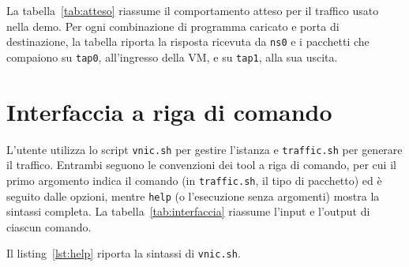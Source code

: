 La tabella~\ref{tab:atteso} riassume il comportamento atteso per il traffico usato nella demo. Per ogni combinazione di programma caricato e porta di destinazione, la tabella riporta la risposta ricevuta da \texttt{ns0} e i pacchetti che compaiono su \texttt{tap0}, all'ingresso della VM, e su \texttt{tap1}, alla sua uscita.

\begin{table}[htbp]
    \centering
    
    \caption{Comportamento atteso per 3 SYN inviati da \texttt{ns0}}
    \label{tab:atteso}
\end{table}

\section{Interfaccia a riga di comando}\label{sec:interfaccia}

L'utente utilizza lo script \texttt{vnic.sh} per gestire l'istanza e \texttt{traffic.sh} per generare il traffico. Entrambi seguono le convenzioni dei tool a riga di comando, per cui il primo argomento indica il comando (in \texttt{traffic.sh}, il tipo di pacchetto) ed è seguito dalle opzioni, mentre \texttt{help} (o l'esecuzione senza argomenti) mostra la sintassi completa. La tabella~\ref{tab:interfaccia} riassume l'input e l'output di ciascun comando.

\begin{table}[H]
    \centering
    
    \caption{Input e output dei comandi di vnic}
    \label{tab:interfaccia}
\end{table}

Il listing~\ref{lst:help} riporta la sintassi di \texttt{vnic.sh}.

